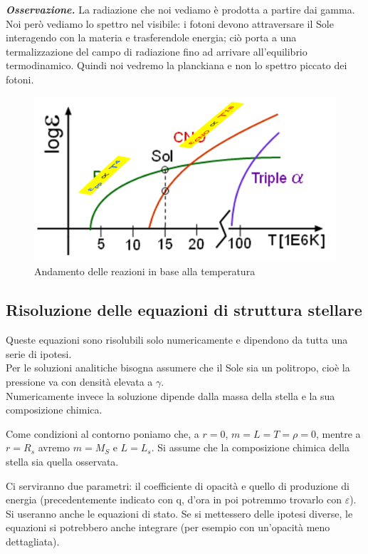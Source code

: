 \documentclass[a4paper,11pt]{article}
\begin{document}
\textbf{\textit{Osservazione.}} La radiazione che noi vediamo è prodotta a partire dai gamma. Noi però vediamo lo spettro nel visibile: i fotoni devono attraversare il Sole interagendo con la materia e trasferendole energia; ciò porta a una termalizzazione del campo di radiazione fino ad arrivare all'equilibrio termodinamico. Quindi noi vedremo la planckiana e non lo spettro piccato dei fotoni.
\begin{figure}[h!]
    \centering
    \includegraphics[scale=0.7]{reazioni.png}
    \caption{Andamento delle reazioni in base alla temperatura}
\end{figure}
\subsection{Risoluzione delle equazioni di struttura stellare}
Queste equazioni sono risolubili solo numericamente e dipendono da tutta una serie di ipotesi.\\
Per le soluzioni analitiche bisogna assumere che il Sole sia un politropo, cioè la pressione va con densità elevata a $\gamma$.\\
Numericamente invece la soluzione dipende dalla massa della stella e la sua composizione chimica.

Come condizioni al contorno poniamo che, a $r=0$, $m=L=T=\rho=0$, mentre a $r=R_s$ avremo $m=M_S$ e $L=L_s$. Si assume che la composizione chimica della stella sia quella osservata.

Ci serviranno due parametri: il coefficiente di opacità e quello di produzione di energia (precedentemente indicato con q, d'ora in poi potremmo trovarlo con $\varepsilon$). Si useranno anche le equazioni di stato.
Se si mettessero delle ipotesi diverse, le equazioni si potrebbero anche integrare (per esempio con un'opacità meno dettagliata).
\end{document}
